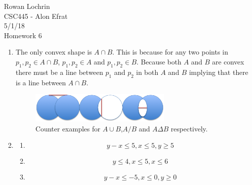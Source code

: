 \documentclass[11pt]{article}
\begin{document}
\begin{flushleft}
	Rowan Lochrin \\
	CSC445 - Alon Efrat\\
	5/1/18 \\
	Homework 6
\end{flushleft}
\begin{enumerate}
	\item The only convex shape is $A\cap B$. This is because for any two
		points in $p_1,p_2 \in A\cap B$, $p_1,p_2\in A$ and $p_1,p_2\in
		B$. Because both $A$ and $B$ are convex there must be a line
		between $p_1$ and $p_2$ in
		both $A$ and $B$ implying that there is a line between $A
		\cap B$.\\
		\begin{figure}[h]
		  \centering
		      \includegraphics[width=0.65\textwidth]{fig1}
		  \caption{
		Counter examples for $A\cup B$,$A/B$ and $A\Delta B$
		respectively.  }
		\end{figure}
	\item 
		\begin{enumerate}
		\item
			$$y - x \leq 5,
			x \leq 5,
			y \geq 5$$
		\item
			$$y \leq4 ,
			x \leq 5,
			x \leq 6$$
		\item
			$$y - x \leq -5,
			x \leq 0,
			y \geq 0$$
		\end{enumerate}


\end{enumerate}
\end{document}
